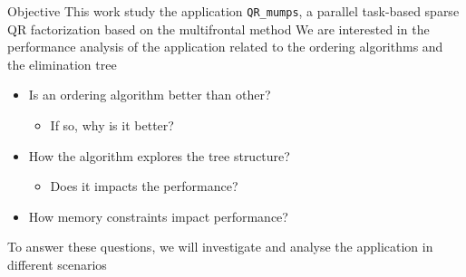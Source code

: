 \documentclass[presentation]{beamer}
\begin{document}
\begin{frame}{Objective}
 \vfill
This work study the application \alert{\texttt{QR\_mumps}}, a parallel task-based
sparse QR factorization based on the \alert{multifrontal method}
\pause \vfill
We are interested in the performance analysis of the application
related to the \alert{ordering algorithms} and the \alert{elimination tree}
\pause \vfill
\begin{itemize}
\item Is an \alert{ordering} algorithm \alert{better than other}? 
\begin{itemize}
\item If so, why is it better?
\end{itemize}
\end{itemize}
\pause \vfill
\begin{itemize}
\item How the algorithm \alert{explores} the tree structure? 
\begin{itemize}
\item Does it impacts the performance?
\end{itemize}
\end{itemize}
\pause \vfill
\begin{itemize}
\item How \alert{memory constraints} impact performance?
\end{itemize}
\pause \vfill
To answer these questions, we will investigate and analyse the
application in different scenarios
\vfill
\end{frame}
\end{document}
